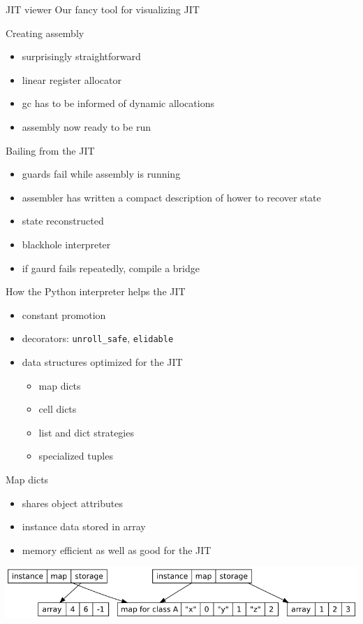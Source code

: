 \documentclass[14pt]{beamer}
\begin{document}
\begin{frame}{JIT viewer}
Our fancy tool for visualizing JIT
\end{frame}

\begin{frame}{Creating assembly}
\begin{itemize}
\item surprisingly straightforward
\item linear register allocator
\item gc has to be informed of dynamic allocations
\item assembly now ready to be run
\end{itemize}
\end{frame}

\begin{frame}{Bailing from the JIT}
\begin{itemize}
\item guards fail while assembly is running
\item assembler has written a compact description of hower to recover state
\item state reconstructed
\item blackhole interpreter
\item if gaurd fails repeatedly, compile a bridge
\end{itemize}
\end{frame}

\begin{frame}[fragile]{How the Python interpreter helps the JIT}
\begin{itemize}
\item constant promotion
\item decorators: \verb+unroll_safe+, \verb+elidable+
\item data structures optimized for the JIT
\begin{itemize}
\item map dicts
\item cell dicts
\item list and dict strategies
\item specialized tuples
\end{itemize}
\end{itemize}
\end{frame}

\begin{frame}{Map dicts}
\begin{itemize}
\item shares object attributes
\item instance data stored in array
\item memory efficient as well as good for the JIT
\end{itemize}
\includegraphics[scale=.45]{instancemap.png}
\end{frame}
\end{document}
